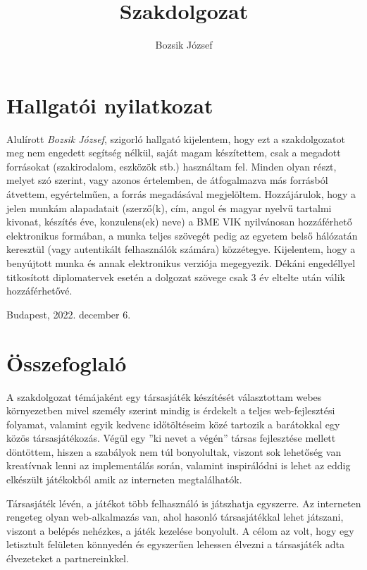 \documentclass[a4paper,twoside]{article}
\title{Szakdolgozat}
\author{Bozsik József}
\begin{document}
\maketitle
\newpage
\tableofcontents
\newpage
{\centering
\section*{Hallgatói nyilatkozat}}
Alulírott \textit{Bozsik József}, szigorló hallgató kijelentem, hogy ezt a szakdolgozatot meg
nem engedett segítség nélkül, saját magam készítettem, csak a megadott forrásokat (szakirodalom, eszközök stb.) használtam fel. Minden olyan részt, melyet szó szerint, vagy
azonos értelemben, de átfogalmazva más forrásból átvettem, egyértelműen, a forrás megadásával megjelöltem.
Hozzájárulok, hogy a jelen munkám alapadatait (szerző(k), cím, angol és magyar
nyelvű tartalmi kivonat, készítés éve, konzulens(ek) neve) a BME VIK nyilvánosan hozzáférhető elektronikus formában, a munka teljes szövegét pedig az egyetem belső hálózatán
keresztül (vagy autentikált felhasználók számára) közzétegye. Kijelentem, hogy a benyújtott munka és annak elektronikus verziója megegyezik. Dékáni engedéllyel titkosított diplomatervek esetén a dolgozat szövege csak 3 év eltelte után válik hozzáférhetővé.
\begin{flushleft}
	Budapest, 2022. december 6.
\end{flushleft}

\newpage
\section{Összefoglaló}
A szakdolgozat témájaként egy társasjáték készítését választottam webes környezetben mivel személy szerint mindig is érdekelt a teljes web-fejlesztési folyamat, valamint egyik kedvenc időtöltéseim közé tartozik a barátokkal egy közös társasjátékozás. 
Végül egy ''ki nevet a végén'' társas fejlesztése mellett döntöttem, hiszen a szabályok nem túl bonyolultak, viszont sok lehetőség van kreatívnak lenni az implementálás során, valamint inspirálódni is lehet az eddig elkészült játékokból amik az interneten megtalálhatók.

Társasjáték lévén, a játékot több felhasználó is játszhatja egyszerre.  Az interneten rengeteg olyan web-alkalmazás van, ahol hasonló társasjátékkal
lehet játszani, viszont a belépés nehézkes, a játék kezelése bonyolult. A célom az volt, hogy
egy letisztult felületen könnyedén és egyszerűen lehessen élvezni a társasjáték adta
élvezeteket a partnereinkkel.
\end{document}
